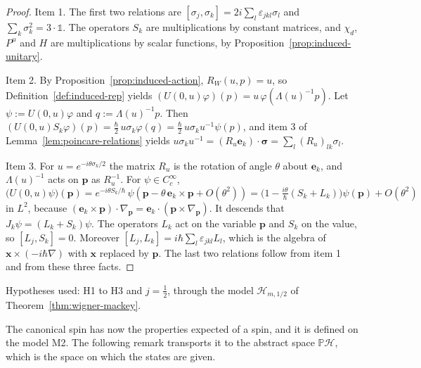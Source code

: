 \begin{proof}
	Item 1. The first two relations are $[\sigma_j,\sigma_k]=2i\sum_l\varepsilon_{jkl}\sigma_l$ and $\sum_k\sigma_k^2=3\cdot\mathbb{1}$. The operators $S_k$ are multiplications by constant matrices, and $\chi_d$, $P^\mu$ and $H$ are multiplications by scalar functions, by Proposition~\ref{prop:induced-unitary}.
	
	Item 2. By Proposition~\ref{prop:induced-action}, $R_W(u,p)=u$, so Definition~\ref{def:induced-rep} yields $(U(0,u)\varphi)(p)=u\,\varphi(\Lambda(u)^{-1}p)$. Let $\psi:=U(0,u)\varphi$ and $q:=\Lambda(u)^{-1}p$. Then $(U(0,u)S_k\varphi)(p)=\frac\hbar2\,u\sigma_k\varphi(q)=\frac\hbar2\,u\sigma_ku^{-1}\psi(p)$, and item 3 of Lemma~\ref{lem:poincare-relations} yields $u\sigma_ku^{-1}=(R_u\mathbf{e}_k)\cdot\boldsymbol{\sigma}=\sum_l(R_u)_{lk}\sigma_l$.
	
	Item 3. For $u=e^{-i\theta\sigma_k/2}$ the matrix $R_u$ is the rotation of angle $\theta$ about $\mathbf{e}_k$, and $\Lambda(u)^{-1}$ acts on $\mathbf{p}$ as $R_u^{-1}$. For $\psi\in C_c^\infty$,
	\begin{equation*}
		\big(U(0,u)\psi\big)(\mathbf{p})=e^{-i\theta S_k/\hbar}\,\psi(\mathbf{p}-\theta\,\mathbf{e}_k\times\mathbf{p}+O(\theta^2))=\big(1-\tfrac{i\theta}{\hbar}(S_k+L_k)\big)\psi(\mathbf{p})+O(\theta^2)
	\end{equation*}
	in $L^2$, because $(\mathbf{e}_k\times\mathbf{p})\cdot\nabla_{\mathbf{p}}=\mathbf{e}_k\cdot(\mathbf{p}\times\nabla_{\mathbf{p}})$. It descends that $J_k\psi=(L_k+S_k)\psi$. The operators $L_k$ act on the variable $\mathbf{p}$ and $S_k$ on the value, so $[L_j,S_k]=0$. Moreover $[L_j,L_k]=i\hbar\sum_l\varepsilon_{jkl}L_l$, which is the algebra of $\mathbf{x}\times(-i\hbar\nabla)$ with $\mathbf{x}$ replaced by $\mathbf{p}$. The last two relations follow from item 1 and from these three facts.
\end{proof}

\noindent Hypotheses used: H1 to H3 and $j=\frac12$, through the model $\mathcal{H}_{m,1/2}$ of Theorem~\ref{thm:wigner-mackey}.

The canonical spin has now the properties expected of a spin, and it is defined on the model M2. The following remark transports it to the abstract space $\mathbb{P}\mathcal{H}$, which is the space on which the states are given.

